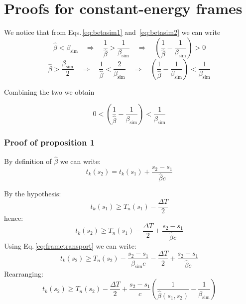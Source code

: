 \section{Proofs for constant-energy frames}
\label{seq:coasting_proofs}


We notice that from Eqs.\,\ref{eq:betasim1} and~\ref{eq:betasim2} we can write
\begin{equation}
\hat{\beta} < \beta_\text{sim}
\quad \Rightarrow \quad
\frac{1}{\hat{\beta}} > \frac{1}{\beta_\text{sim}}
\quad \Rightarrow \quad
\left(
\frac{1}{\hat{\beta}} - \frac{1}{\beta_\text{sim}}
\right) > 0
\end{equation}
\begin{equation}
\hat{\beta} > \frac{\beta_\text{sim}}{2}
\quad \Rightarrow \quad
\frac{1}{\hat{\beta}} < \frac{2}{\beta_\text{sim}}
\quad \Rightarrow \quad
\left(
\frac{1}{\hat{\beta}} - \frac{1}{\beta_\text{sim}}
\right) < \frac{1}{\beta_\text{sim}}
\end{equation}

Combining the two we obtain

\begin{equation}
0<\left(
\frac{1}{\hat{\beta}} - \frac{1}{\beta_\text{sim}}
\right) < \frac{1}{\beta_\text{sim}}
\label{eq:betaineq}
\end{equation}

\subsubsection*{Proof of proposition 1}
By definition of $\hat{\beta}$ we can write:
\begin{equation}
t_k(s_2) = t_k(s_1) + \frac{s_2 - s_1}{\hat{\beta} c}
\label{eq:tk2fromtk1}
\end{equation}

By the hypothesis:
\begin{equation}
t_k(s_1) \geq T_n(s_1) - \frac{\Delta T}{2}
\end{equation}
hence:
\begin{equation}
t_k(s_2) \geq T_n(s_1) - \frac{\Delta T}{2} + \frac{s_2 - s_1}{\hat{\beta} c}
\end{equation}
Using Eq.\,\ref{eq:frametransport} we can write:
\begin{equation}
t_k(s_2) \geq T_n(s_2) - \frac{s_2 - s_1}{{\beta}_\text{sim} c}  - \frac{\Delta T}{2} + \frac{s_2 - s_1}{\hat{\beta} c}
\end{equation}
Rearranging:
\begin{equation}
t_k(s_2) \geq T_n(s_2) - \frac{\Delta T}{2} + \frac{s_2 - s_1}{c} \left(
\frac{1}{\hat{\beta}(s_1,s_2)} - \frac{1}{\beta_\text{sim}}
\right)
\end{equation}

